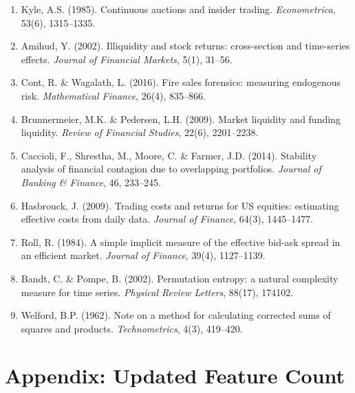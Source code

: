 \documentclass[11pt,a4paper]{article}
\begin{document}
\begin{enumerate}
    \item Kyle, A.S. (1985). Continuous auctions and insider trading. \textit{Econometrica}, 53(6), 1315--1335.

    \item Amihud, Y. (2002). Illiquidity and stock returns: cross-section and time-series effects. \textit{Journal of Financial Markets}, 5(1), 31--56.

    \item Cont, R. \& Wagalath, L. (2016). Fire sales forensics: measuring endogenous risk. \textit{Mathematical Finance}, 26(4), 835--866.

    \item Brunnermeier, M.K. \& Pedersen, L.H. (2009). Market liquidity and funding liquidity. \textit{Review of Financial Studies}, 22(6), 2201--2238.

    \item Caccioli, F., Shrestha, M., Moore, C. \& Farmer, J.D. (2014). Stability analysis of financial contagion due to overlapping portfolios. \textit{Journal of Banking \& Finance}, 46, 233--245.

    \item Hasbrouck, J. (2009). Trading costs and returns for US equities: estimating effective costs from daily data. \textit{Journal of Finance}, 64(3), 1445--1477.

    \item Roll, R. (1984). A simple implicit measure of the effective bid-ask spread in an efficient market. \textit{Journal of Finance}, 39(4), 1127--1139.

    \item Bandt, C. \& Pompe, B. (2002). Permutation entropy: a natural complexity measure for time series. \textit{Physical Review Letters}, 88(17), 174102.

    \item Welford, B.P. (1962). Note on a method for calculating corrected sums of squares and products. \textit{Technometrics}, 4(3), 419--420.
\end{enumerate}

\section*{Appendix: Updated Feature Count}
\end{document}
